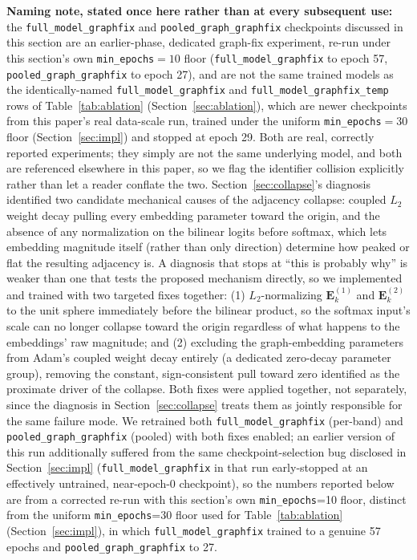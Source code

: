 \documentclass[journal]{IEEEtran}
\begin{document}
\textbf{Naming note, stated once here rather than at every subsequent use:} the \texttt{full\_model\_graphfix} and \texttt{pooled\_graph\_graphfix} checkpoints discussed in this section are an earlier-phase, dedicated graph-fix experiment, re-run under this section's own \texttt{min\_epochs}$=10$ floor (\texttt{full\_model\_graphfix} to epoch 57, \texttt{pooled\_graph\_graphfix} to epoch 27), and are not the same trained models as the identically-named \texttt{full\_model\_graphfix} and \texttt{full\_model\_graphfix\_temp} rows of Table~\ref{tab:ablation} (Section~\ref{sec:ablation}), which are newer checkpoints from this paper's real data-scale run, trained under the uniform \texttt{min\_epochs}$=30$ floor (Section~\ref{sec:impl}) and stopped at epoch 29. Both are real, correctly reported experiments; they simply are not the same underlying model, and both are referenced elsewhere in this paper, so we flag the identifier collision explicitly rather than let a reader conflate the two. Section~\ref{sec:collapse}'s diagnosis identified two candidate mechanical causes of the adjacency collapse: coupled $L_2$ weight decay pulling every embedding parameter toward the origin, and the absence of any normalization on the bilinear logits before softmax, which lets embedding magnitude itself (rather than only direction) determine how peaked or flat the resulting adjacency is. A diagnosis that stops at ``this is probably why'' is weaker than one that tests the proposed mechanism directly, so we implemented and trained with two targeted fixes together: (1) $L_2$-normalizing $\mathbf{E}^{(1)}_k$ and $\mathbf{E}^{(2)}_k$ to the unit sphere immediately before the bilinear product, so the softmax input's scale can no longer collapse toward the origin regardless of what happens to the embeddings' raw magnitude; and (2) excluding the graph-embedding parameters from Adam's coupled weight decay entirely (a dedicated zero-decay parameter group), removing the constant, sign-consistent pull toward zero identified as the proximate driver of the collapse. Both fixes were applied together, not separately, since the diagnosis in Section~\ref{sec:collapse} treats them as jointly responsible for the same failure mode. We retrained both \texttt{full\_model\_graphfix} (per-band) and \texttt{pooled\_graph\_graphfix} (pooled) with both fixes enabled; an earlier version of this run additionally suffered from the same checkpoint-selection bug disclosed in Section~\ref{sec:impl} (\texttt{full\_model\_graphfix} in that run early-stopped at an effectively untrained, near-epoch-0 checkpoint), so the numbers reported below are from a corrected re-run with this section's own \texttt{min\_epochs}=10 floor, distinct from the uniform \texttt{min\_epochs}=30 floor used for Table~\ref{tab:ablation} (Section~\ref{sec:impl}), in which \texttt{full\_model\_graphfix} trained to a genuine 57 epochs and \texttt{pooled\_graph\_graphfix} to 27.
\end{document}
